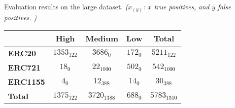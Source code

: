 \begin{table}[t]
\centering
\small

{Evaluation results on the large dataset. }
{\textit{($x_{(y)}$: 
$x$ true positives, and $y$ false positives.
)}
}
{
\begin{tabular}{|l||c|c|c||c|}
\hline
                 &  {\textbf{High}} & {\textbf{Medium}} & {\textbf{Low}}  & {\textbf{Total}} \\ 



\hline
\hline

{\textbf{ERC20}}     & $1353_{122}$  & $3686_{0}$  & $172_{0}$    & $5211_{122}$    \\ \hline

{\textbf{ERC721}}    & $18_{0}$        & $22_{1000}$    & $502_{0}$   & $542_{1000}$  \\ \hline
{\textbf{ERC1155}}   & $4_{0}$         & $12_{388}$    & $14_{0}$    & $30_{388}$ \\ \hline \hline
{\textbf{Total}}     & $1375_{122}$  & $3720_{1388}$  & $688_{0}$  & $5783_{1510}$ \\ \hline

\end{tabular}
}

 \vspace{-0.1in}
\end{table}